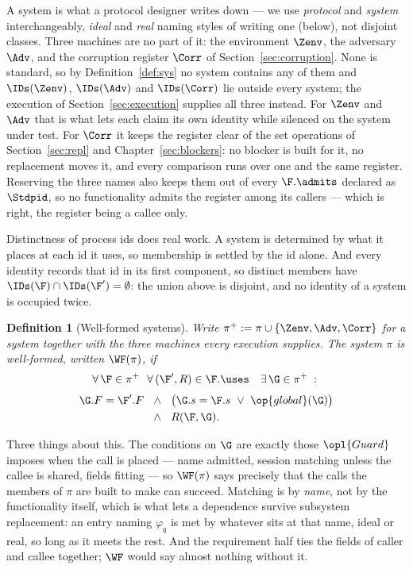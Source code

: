 \documentclass[10pt,oneside,openany]{book}
\theoremstyle{accentdef}
\newtheorem{definition}{Definition}[chapter]
\theoremstyle{accentplain}
\begin{document}
A system is what a protocol designer writes down --- we use \emph{protocol} and \emph{system}
interchangeably, \emph{ideal} and \emph{real} naming styles of writing one (below), not disjoint
classes. Three machines are no part of it: the
environment $\Zenv$, the adversary $\Adv$, and the corruption register $\Corr$ of
Section~\ref{sec:corruption}. None is standard, so by Definition~\ref{def:sys} no system contains
any of them and $\IDs(\Zenv)$, $\IDs(\Adv)$ and $\IDs(\Corr)$ lie outside every system; the
execution of Section~\ref{sec:execution} supplies all three instead. For $\Zenv$ and $\Adv$ that
is what lets each claim its own identity while silenced on the system under test. For $\Corr$ it
keeps the register clear of the set operations of Section~\ref{sec:repl} and Chapter~\ref{sec:blockers}:
no blocker is built for it, no replacement moves it, and every comparison runs over one and the
same register. Reserving the three names also keeps them out of every $\F.\admits$ declared as
$\Stdpid$, so no functionality admits the register among its callers --- which is right, the
register being a callee only.

Distinctness of process ids does real work. A system is determined by what it places at each id
it uses, so membership is settled by the id alone. And every identity records that id in its
first component, so distinct members have $\IDs(\F) \cap \IDs(\F') = \emptyset$: the union above
is disjoint, and no identity of a system is occupied twice.

\begin{definition}[Well-formed systems]\label{def:wfsys}
Write $\pi^{+} := \pi \cup \{\Zenv,\Adv,\Corr\}$ for a system together with the three machines
every execution supplies. The system $\pi$ is \emph{well-formed}, written $\WF(\pi)$, if
\[
  \begin{gathered}
  \forall\, \F \in \pi^{+} \ \ \forall\, (\F',R) \in \F.\uses \ \ \ \exists\, \G \in \pi^{+} \;:\; \\[3pt]
  \begin{aligned}
  \G.F = \F'.F \ \ &\wedge\ \ \bigl(\G.s = \F.s \ \vee\ \op{global}(\G)\bigr) \\
  &\wedge\ \ R(\F,\G) .
  \end{aligned}
  \end{gathered}
\]
\end{definition}

Three things about this. The conditions on $\G$ are exactly those $\opl{Guard}$ imposes when the
call is placed --- name admitted, session matching unless the callee is shared, fields fitting ---
so $\WF(\pi)$ says precisely that the calls the members of $\pi$ are built to make can succeed.
Matching is by \emph{name}, not by the functionality itself, which is what lets a dependence
survive subsystem replacement: an entry naming $\varphi_q$ is met by whatever sits at that name,
ideal or real, so long as it meets the rest. And the requirement half ties the fields of caller
and callee together; $\WF$ would say almost nothing without it.
\end{document}
